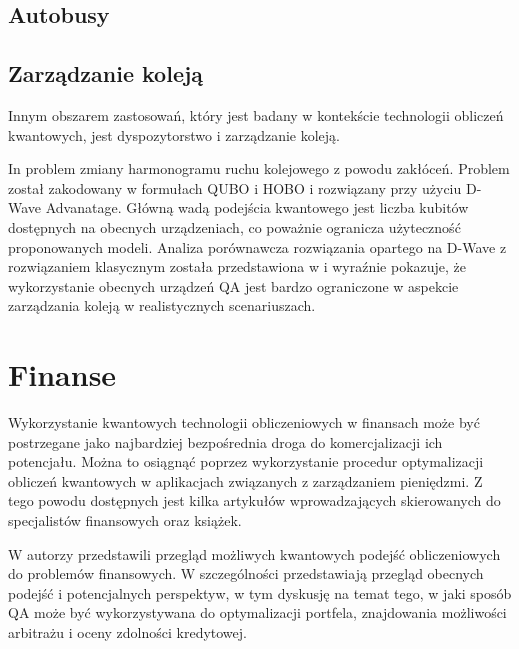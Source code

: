 \documentclass[a4paper,11pt]{article}
\begin{document}
\cite{correll2023quantum}


\subsection{Autobusy}
 \cite{yarkoni2020quantum}

\newpage 
\subsection{Zarządzanie koleją}

Innym obszarem zastosowań, który jest badany w kontekście technologii obliczeń kwantowych, jest dyspozytorstwo i zarządzanie koleją.


In \cite{domino2022quadratic} problem zmiany harmonogramu ruchu kolejowego z powodu zakłóceń. Problem został zakodowany w formułach QUBO i HOBO i rozwiązany przy użyciu D-Wave Advanatage. Główną wadą podejścia kwantowego jest liczba kubitów dostępnych na obecnych urządzeniach, co poważnie ogranicza użyteczność proponowanych modeli. Analiza porównawcza rozwiązania opartego na D-Wave z rozwiązaniem klasycznym została przedstawiona w \cite{domino2023quantum} i wyraźnie pokazuje, że wykorzystanie obecnych urządzeń QA jest bardzo ograniczone w aspekcie zarządzania koleją w realistycznych scenariuszach. 

\newpage 

\section{Finanse}


Wykorzystanie kwantowych technologii obliczeniowych w finansach może być postrzegane jako najbardziej bezpośrednia droga do komercjalizacji ich potencjału. Można to osiągnąć poprzez wykorzystanie procedur optymalizacji obliczeń kwantowych w aplikacjach związanych z zarządzaniem pieniędzmi. Z tego powodu dostępnych jest kilka artykułów wprowadzających skierowanych do specjalistów finansowych oraz książek.

W \cite{orus2019quantum} autorzy przedstawili przegląd możliwych kwantowych podejść obliczeniowych do problemów finansowych. W szczególności przedstawiają przegląd obecnych podejść i potencjalnych perspektyw, w tym dyskusję na temat tego, w jaki sposób QA może być wykorzystywana do optymalizacji portfela, znajdowania możliwości arbitrażu i oceny zdolności kredytowej.
\end{document}
